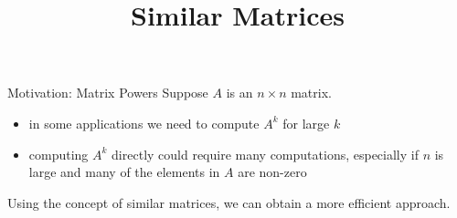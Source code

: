 \title{Similar Matrices}
\subtitle{\SubTitleName}
\institute[]{\Course}
\author{\Instructor}
\maketitle   






\begin{frame}{Motivation: Matrix Powers}
    Suppose $A$ is an $n\times n$ matrix.
    \begin{itemize}
        \item in some applications we need to compute $A^k$ for large $k$
        \item computing $A^k$ directly could require many computations, especially if $n$ is large and many of the elements in $A$ are non-zero
   \end{itemize}
    Using the concept of similar matrices, we can obtain a more efficient approach. 
\end{frame}



